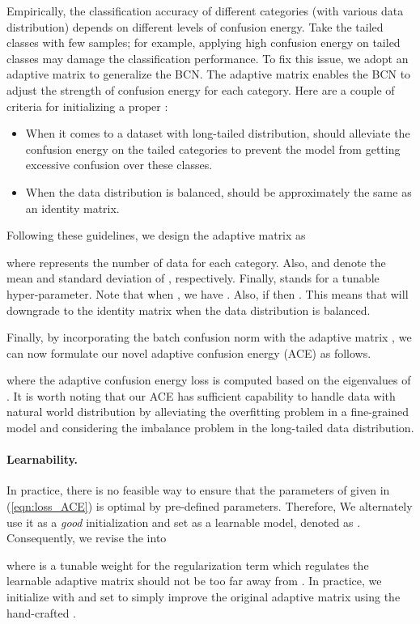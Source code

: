 \documentclass{article}
\begin{document}
Empirically, the classification accuracy of different categories (with various data distribution) depends on different levels of confusion energy. Take the tailed classes with few samples; for example, applying high confusion energy on tailed classes may damage the classification performance. To fix this issue, we adopt an adaptive matrix  to generalize the BCN. The adaptive matrix  enables the BCN to adjust the strength of confusion energy for each category. Here are a couple of criteria for initializing a proper :
\begin{itemize}
    \item When it comes to a dataset with long-tailed distribution,  should alleviate the confusion energy on the tailed categories to prevent the model from getting excessive confusion over these classes. 
    \item When the data distribution is balanced,  should be approximately the same as an identity matrix.
\end{itemize}

Following these guidelines, we design the adaptive matrix  as
\begin{linenomath}

\end{linenomath}
where  represents the number of data for each category. Also,  and  denote the mean and standard deviation of , respectively. Finally,  stands for a tunable hyper-parameter. Note that when , we have . Also, if  then . This means that  will downgrade to the identity matrix when the data distribution is balanced.

Finally, by incorporating the batch confusion norm with the adaptive matrix , we can now formulate our novel adaptive confusion energy (ACE) as follows. 
\begin{linenomath}

\end{linenomath}
where the adaptive confusion energy loss  is computed based on the eigenvalues of . 
It is worth noting that our ACE has sufficient capability to handle data with natural world distribution by alleviating the overfitting problem in a fine-grained model and considering the imbalance problem in the long-tailed data distribution.

\paragraph{Learnability.} In practice, there is no feasible way to ensure that the parameters of  given in (\ref{eqn:loss_ACE}) is optimal by pre-defined parameters. Therefore, We alternately use it as a {\em good} initialization and set  as a learnable model, denoted as . Consequently,  we revise the  into
\begin{linenomath}

\end{linenomath}
where  is a tunable weight for the regularization term which regulates the learnable adaptive matrix  should not be too far away from . In practice, we initialize  with  and set  to simply improve the original adaptive matrix using the hand-crafted .
\end{document}
